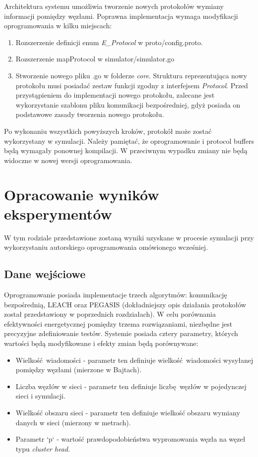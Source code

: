 \documentclass[a4paper,12pt,twoside,openany]{report}
\begin{document}
Architektura systemu umożliwia tworzenie nowych protokołów wymiany informacji pomiędzy węzłami.
Poprawna implementacja wymaga modyfikacji oprogramowania w kilku miejscach:

\begin{enumerate}
 \item Rozszerzenie definicji enum \textit{E\_Protocol} w proto/config.proto.
 \item Rozszerzenie mapProtocol w simulator/simulator.go
 \item Stworzenie nowego pliku .go w folderze \textit{core}. Struktura reprezentująca nowy protokołu musi posiadać zestaw funkcji zgodny z interfejsem \textit{Protocol}.
       Przed przystąpieniem do implementacji nowego protokołu, zalecane jest wykorzystanie szablonu pliku komunikacji bezpośredniej, gdyż posiada on podstawowe zasady tworzenia nowego protokołu.
\end{enumerate}

Po wykonaniu wszystkich powyższych kroków, protokół może zostać wykorzystany w symulacji.
Należy pamiętać, że oprogramowanie i protocol buffers będą wymagały ponownej kompilacji. W przeciwnym wypadku zmiany nie będą widoczne w nowej wersji oprogramowania.

\chapter{Opracowanie wyników eksperymentów}

W tym rodziale przedstawione zostaną wyniki uzyskane w procesie symulacji przy wykorzystaniu autorskiego oprogramowania omówionego wcześniej.

\section{Dane wejściowe}

Oprogramowanie posiada implementacje trzech algorytmów: komunikację bezpośrednią, LEACH oraz PEGASIS (dokładniejszy opis działania protokołów został przedstawiony w poprzednich rozdziałach).
W celu porównania efektywności energetycznej pomiędzy trzema rozwiązaniami, niezbędne jest precyzyjne zdefiniowanie testów.
Systemie posiada cztery parametry, których wartości będą modyfikowane i efekty zmian będą porównywane:

\begin{itemize}
 \item Wielkość wiadomości - parametr ten definiuje wielkość wiadomości wysyłanej pomiędzy węzłami (mierzone w Bajtach).
 \item Liczba węzłów w sieci - parametr ten definiuje liczbę węzłów w pojedynczej sieci i symulacji.
 \item Wielkość obszaru sieci - parametr ten definiuje wielkość obszaru wymiany danych w sieci (mierzony w metrach).
 \item Parametr `p` - wartość prawdopodobieństwa wypromowania węzła na węzeł typu \textit{cluster head}.
\end{itemize}
\end{document}
